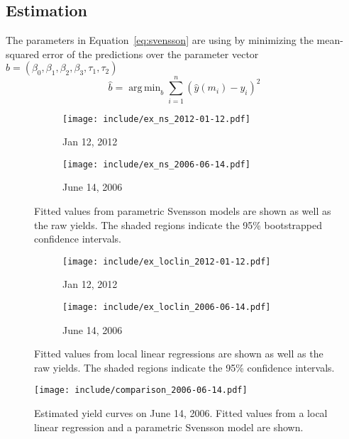 \documentclass[12pt]{article}
\DeclareMathOperator*{\argmin}{arg\,min}
\begin{document}
\subsection{Estimation}

The parameters in Equation~\ref{eq:svensson} are using by minimizing the mean-squared error of the predictions over the parameter vector $b = (\beta_0, \beta_1, \beta_2, \beta_3, \tau_1, \tau_2)$
\begin{equation*}
\hat{b} = \argmin_{b} \sum_{i=1}^n \left( \hat{y}(m_i) - y_i \right)^2
\end{equation*}


\begin{figure}[htb] \centering
    \begin{subfigure}[t]{.49\linewidth}
        \texttt{[image: include/ex\_ns\_2012-01-12.pdf]}
        \caption{Jan 12, 2012}
    \end{subfigure}
    \begin{subfigure}[t]{.49\linewidth}
        \texttt{[image: include/ex\_ns\_2006-06-14.pdf]}
        \caption{June 14, 2006}
    \end{subfigure}
    \caption{Fitted values from parametric Svensson models are shown as well as the raw yields. The shaded regions indicate the 95\% bootstrapped confidence intervals.}
    \label{fig:ex_ns}
\end{figure}



\begin{figure}[htb] \centering
    \begin{subfigure}[t]{.49\linewidth}
        \texttt{[image: include/ex\_loclin\_2012-01-12.pdf]}
        \caption{Jan 12, 2012}
    \end{subfigure}
    \begin{subfigure}[t]{.49\linewidth}
        \texttt{[image: include/ex\_loclin\_2006-06-14.pdf]}
        \caption{June 14, 2006}
    \end{subfigure}
    \caption{Fitted values from local linear regressions are shown as well as the raw yields. The shaded regions indicate the 95\% confidence intervals.}
    \label{fig:ex_loclin}
\end{figure}



\begin{figure}[htb]
    \centering
    \texttt{[image: include/comparison\_2006-06-14.pdf]}
    \caption{Estimated yield curves on June 14, 2006. Fitted values from a local linear regression and a parametric Svensson model are shown.}
    \label{fig:comparison_bad}
\end{figure}
\end{document}
